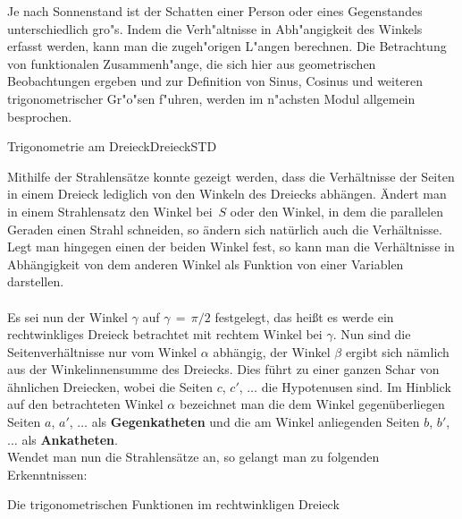 

\begin{MIntro}
Je nach Sonnenstand ist der Schatten einer Person oder eines Gegenstandes 
unterschiedlich gro"s. Indem die Verh"altnisse in Abh"angigkeit des Winkels
erfasst werden, kann man die zugeh"origen L"angen berechnen. Die Betrachtung
von funktionalen Zusammenh"ange, die sich hier aus geometrischen Beobachtungen 
ergeben und zur Definition von Sinus, Cosinus und weiteren trigonometrischer 
Gr"o"sen f"uhren, werden im n"achsten Modul allgemein besprochen.
\end{MIntro}

\begin{MXContent}{Trigonometrie am Dreieck}{Dreieck}{STD}

Mithilfe der Strahlens\"atze konnte gezeigt werden, dass die Verh\"altnisse der
Seiten in einem Dreieck lediglich von den Winkeln des Dreiecks abh\"angen. \"Andert man
in einem Strahlensatz den Winkel bei~$S$ oder den Winkel, in dem die
parallelen Geraden einen Strahl schneiden, so \"andern sich nat\"urlich
auch die Verh\"altnisse.
Legt man hingegen einen der beiden Winkel fest, so kann man die
Verh\"altnisse in Abh\"angigkeit von dem anderen Winkel als Funktion
von einer Variablen darstellen.\\
\ \\
Es sei nun der Winkel $\gamma$ auf $\gamma\,=\,\pi/2$ festgelegt, das hei\ss t es werde ein rechtwinkliges Dreieck betrachtet mit rechtem Winkel bei $\gamma$. Nun sind die Seitenverh\"altnisse nur vom Winkel $\alpha$ abh\"angig, der Winkel $\beta$ ergibt sich n\"amlich aus der Winkelinnensumme des Dreiecks. Dies f\"uhrt zu einer ganzen Schar von \"ahnlichen Dreiecken, wobei die Seiten $c$, $c'$, $\ldots$ die Hypotenusen sind. Im Hinblick auf den betrachteten Winkel $\alpha$ bezeichnet man die dem Winkel gegen\"uberliegen Seiten
$a$, $a'$, $\ldots$ als \textbf{Gegenkatheten} und die am Winkel anliegenden Seiten $b$, $b'$, $\ldots$ als \textbf{Ankatheten}.\\
Wendet man nun die Strahlens\"atze an, so gelangt man zu folgenden Erkenntnissen: 

\begin{MXInfo}{Die trigonometrischen Funktionen im rechtwinkligen Dreieck}
%


\end{MXInfo}
\end{MXContent}
